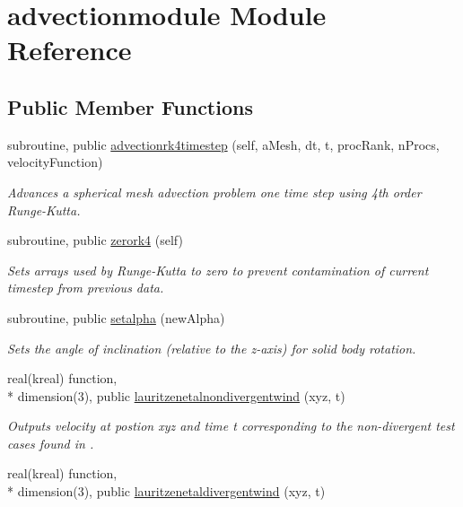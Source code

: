\hypertarget{classadvectionmodule}{\section{advectionmodule Module Reference}
\label{classadvectionmodule}
}
\subsection*{Public Member Functions}
\begin{DoxyCompactItemize}
\item 
subroutine, public \hyperlink{group__AdvectionRK4_ga9a42b57d9bea0b541418b2bb32ae1ba1}{advectionrk4timestep} (self, a\+Mesh, dt, t, proc\+Rank, n\+Procs, velocity\+Function)
\begin{DoxyCompactList}\small\item\em Advances a spherical mesh advection problem one time step using 4th order Runge-\/\+Kutta. \end{DoxyCompactList}\item 
subroutine, public \hyperlink{group__AdvectionRK4_ga60bf7e4fea5c15f0e916c04888b9770b}{zerork4} (self)
\begin{DoxyCompactList}\small\item\em Sets arrays used by Runge-\/\+Kutta to zero to prevent contamination of current timestep from previous data. \end{DoxyCompactList}\item 
subroutine, public \hyperlink{group__AdvectionRK4_ga0eaf17769aa944b4bded630e3eb300c1}{setalpha} (new\+Alpha)
\begin{DoxyCompactList}\small\item\em Sets the angle of inclination (relative to the z-\/axis) for solid body rotation. \end{DoxyCompactList}\item 
real(kreal) function, \\*
dimension(3), public \hyperlink{group__AdvectionRK4_ga7f11298031417d6f2c3987bd4b363c37}{lauritzenetalnondivergentwind} (xyz, t)
\begin{DoxyCompactList}\small\item\em Outputs velocity at postion xyz and time t corresponding to the non-\/divergent test cases found in \cite{LauritzenEtAl2012}. \end{DoxyCompactList}\item 
real(kreal) function, \\*
dimension(3), public \hyperlink{group__AdvectionRK4_ga8f7661486a24b73e0ccff377adfb29db}{lauritzenetaldivergentwind} (xyz, t)

\end{DoxyCompactItemize}
